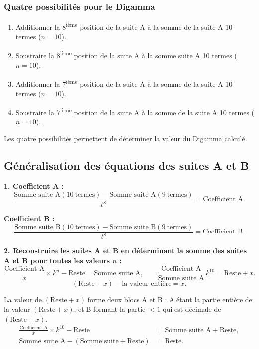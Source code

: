 \documentclass[11pt,a4paper]{article}
\begin{document}
\subsubsection{Quatre possibilités pour le Digamma}

\begin{enumerate}[nosep]
  \item Additionner la 8\textsuperscript{ième} position de la suite A à la somme de la suite A 10 termes ($n=10$).
  \item Soustraire la 8\textsuperscript{ième} position de la suite A à la somme suite A 10 termes ($n=10$).
  \item Additionner la 7\textsuperscript{ième} position de la suite A à la somme de la suite A 10 termes ($n=10$).
  \item Soustraire la 7\textsuperscript{ième} position de la suite A à la somme de la suite A 10 termes ($n=10$).
\end{enumerate}

Les quatre possibilités permettent de déterminer la valeur du Digamma calculé.

\subsection{Généralisation des équations des suites A et B}

\textbf{1. Coefficient A :}
\[
\frac{\text{Somme suite A}(10\ \text{termes}) - \text{Somme suite A}(9\ \text{termes})}{t^{8}}
= \text{Coefficient A}.
\]

\textbf{Coefficient B :}
\[
\frac{\text{Somme suite B}(10\ \text{termes}) - \text{Somme suite B}(9\ \text{termes})}{t^{8}}
= \text{Coefficient B}.
\]

\textbf{2. Reconstruire les suites A et B en déterminant la somme des suites A
et B pour toutes les valeurs $n$ :}
\[
\frac{\text{Coefficient A}}{x} \times k^{n} - \text{Reste} = \text{Somme suite A},
\qquad
\frac{\text{Coefficient A}}{\text{Somme suite A}}\, k^{10} = \text{Reste} + x .
\]
\[
(\text{Reste} + x) - \text{la valeur entière} = x .
\]

La valeur de $(\text{Reste} + x)$ forme deux blocs A et B : A étant la partie
entière de la valeur $(\text{Reste} + x)$, et B formant la partie $< 1$ qui est
décimale de $(\text{Reste} + x)$.
\begin{align*}
\frac{\text{Coefficient A}}{x}\times k^{10}-\text{Reste}
&=\text{Somme suite A}+\text{Reste},\\
\text{Somme suite A}-(\text{Somme suite}+\text{Reste})
&=\text{Reste}.
\end{align*}
\end{document}
